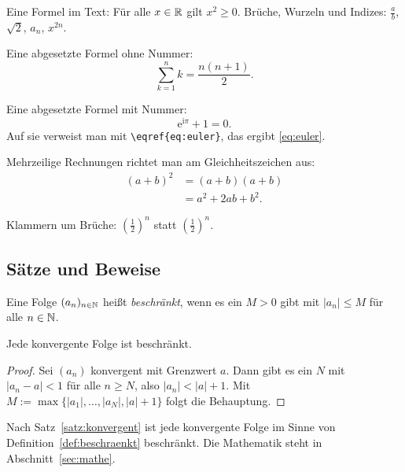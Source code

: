 Eine Formel im Text: Für alle $x \in \mathbb{R}$ gilt $x^2 \geq 0$.
Brüche, Wurzeln und Indizes: $\frac{a}{b}$, $\sqrt{2}$, $a_n$, $x^{2n}$.

Eine abgesetzte Formel ohne Nummer:
\[
	\sum_{k=1}^{n} k = \frac{n(n+1)}{2} .
\]

Eine abgesetzte Formel mit Nummer:
\begin{equation}\label{eq:euler}
	\mathrm{e}^{\mathrm{i}\pi} + 1 = 0 .
\end{equation}
Auf sie verweist man mit \verb|\eqref{eq:euler}|, das ergibt \eqref{eq:euler}.

Mehrzeilige Rechnungen richtet man am Gleichheitszeichen aus:
\begin{align*}
	(a+b)^2 &= (a+b)(a+b) \\
	        &= a^2 + 2ab + b^2 .
\end{align*}

Klammern um Brüche: $\left( \frac{1}{2} \right)^n$ statt $(\frac{1}{2})^n$.

\subsection{Sätze und Beweise}

\begin{definition}\label{def:beschraenkt}
Eine Folge $(a_n)_{n\in\mathbb{N}}$ heißt \emph{beschränkt}, wenn es ein $M > 0$ gibt mit $|a_n| \leq M$ für alle $n \in \mathbb{N}$.
\end{definition}

\begin{satz}\label{satz:konvergent}
Jede konvergente Folge ist beschränkt.
\end{satz}

\begin{proof}
Sei $(a_n)$ konvergent mit Grenzwert $a$.
Dann gibt es ein $N$ mit $|a_n - a| < 1$ für alle $n \geq N$, also $|a_n| < |a| + 1$.
Mit $M := \max\{|a_1|, \dots, |a_{N}|, |a| + 1\}$ folgt die Behauptung.
\end{proof}

Nach Satz~\ref{satz:konvergent} ist jede konvergente Folge im Sinne von Definition~\ref{def:beschraenkt} beschränkt.
Die Mathematik steht in Abschnitt~\ref{sec:mathe}.

